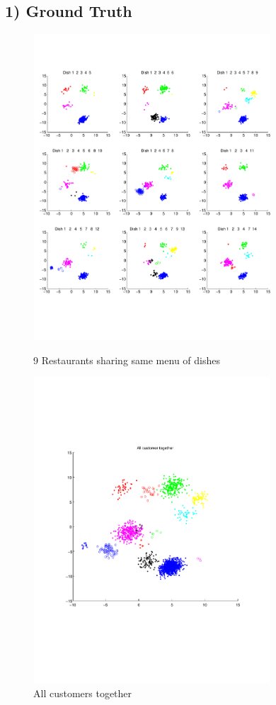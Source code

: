 \documentclass{article}
\begin{document}
\begin{spacing}{1.1}
\subsection{1) Ground Truth}
\begin{figure}[h] 
  \begin{minipage}[b]{0.5\textwidth} 
    \centering 
        \includegraphics[width=3.5in,height=4.5in]{g_t.pdf} 
    \caption{9 Restaurants sharing same menu of dishes} 
    \label{fig:by:table} 
  \end{minipage}%
  \begin{minipage}[b]{0.5\textwidth} 
    \centering 
    \includegraphics[width=3.5in,height=4.5in]{g_t2.pdf} 
    \caption{All customers together}
    \label{fig:by:table}  
   \end{minipage}%
\end{figure}




\end{spacing}
\end{document}
